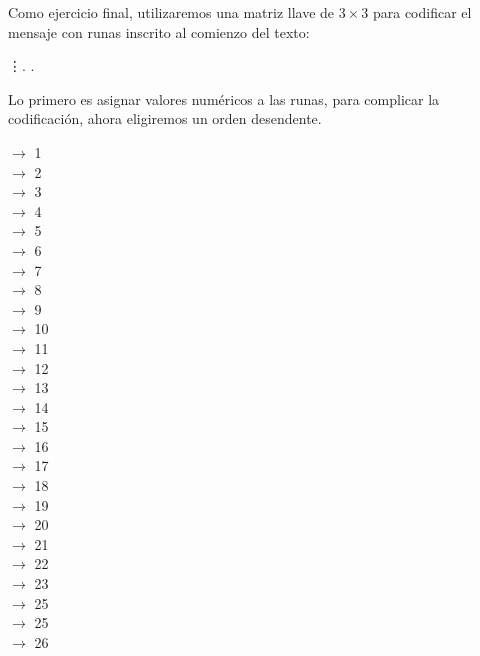 \documentclass[12pt,a4paper]{article}
\begin{document}
Como ejercicio final, utilizaremos una matriz llave de $3\times 3$ para codificar el mensaje con runas inscrito al comienzo del texto:
\vspace{0.2cm}
\begin{center}
               \vdots  \textara{\th}. \textara{\th}.
\end{center}
\vspace{0.2cm}
 Lo primero es asignar valores num\'ericos a las runas, para complicar la codificaci\'on, ahora eligiremos un orden desendente.

\begin{multicols}{7}
\noindent{}$\rightarrow$ 1\\
$\rightarrow$ 2\\
$\rightarrow$ 3\\
$\rightarrow$ 4\\
$\rightarrow$ 5\\
$\rightarrow$ 6\\
$\rightarrow$ 7\\
$\rightarrow$ 8\\
$\rightarrow$ 9\\
$\rightarrow$ 10\\
$\rightarrow$ 11\\
$\rightarrow$ 12\\
$\rightarrow$ 13\\
$\rightarrow$ 14\\
\textara{\ng}$\rightarrow$ 15\\
$\rightarrow$ 16\\
$\rightarrow$ 17\\
$\rightarrow$ 18\\
$\rightarrow$ 19\\
$\rightarrow$ 20\\
$\rightarrow$ 21\\
\textara{\th } $\rightarrow$ 22\\
$\rightarrow$ 23\\
$\rightarrow$ 25\\
$\rightarrow$ 25\\
$\rightarrow$ 26\\

\end{multicols}
 



 
\end{document}
